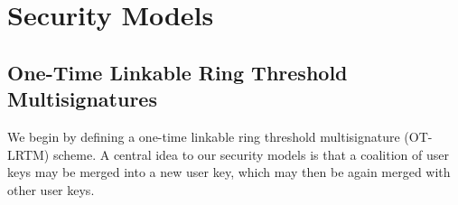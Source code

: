 \documentclass{mrl}
\theoremstyle{definition}
\begin{document}
\section{Security Models}


\subsection{One-Time Linkable Ring Threshold Multisignatures}\label{sec:otlrtm}

We begin by defining a one-time linkable ring threshold multisignature (OT-LRTM) scheme. A central idea to our security models is that a coalition of user keys may be merged into a new user key, which may then be again merged with other user keys. 
\end{document}
